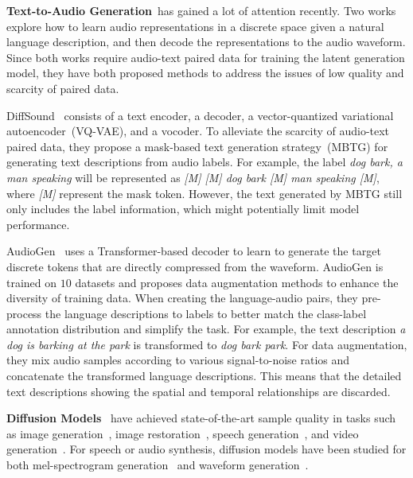 \documentclass{article}
\begin{document}
\label{TTA}








\textbf{Text-to-Audio Generation}~has gained a lot of attention recently. Two works~\cite{yang2022diffsound,kreuk2022audiogen} explore how to learn audio representations in a discrete space given a natural language description, and then decode the representations to the audio waveform. Since both works require audio-text paired data for training the latent generation model, they have both proposed methods to address the issues of low quality and scarcity of paired data.

DiffSound~\cite{yang2022diffsound} consists of a text encoder, a decoder, a vector-quantized variational autoencoder~(VQ-VAE), and a vocoder. To alleviate the scarcity of audio-text paired data, they propose a mask-based text generation strategy~(MBTG) for generating text descriptions from audio labels. For example, the label \textit{dog bark, a man speaking} will be represented as \textit{[M] [M] dog bark [M] man speaking [M]}, where \textit{[M]} represent the mask token. However, the text generated by MBTG still only includes the label information, which might potentially limit model performance. 


AudioGen~\cite{kreuk2022audiogen} uses a Transformer-based decoder to learn to generate the target discrete tokens that are directly compressed from the waveform. AudioGen is trained on $10$ datasets and proposes data augmentation methods to enhance the diversity of training data. When creating the language-audio pairs, they pre-process the language descriptions to labels to better match the class-label annotation distribution and simplify the task. For example, 
the text description \textit{a dog is barking at the park} is transformed to \textit{dog bark park}. For data augmentation, they mix audio samples according to various signal-to-noise ratios and concatenate the transformed language descriptions. This means that the detailed text descriptions showing the spatial and temporal relationships are discarded.



\textbf{Diffusion Models}~\cite{DDPM, SGM} have achieved state-of-the-art sample quality in tasks such as image generation~\cite{DiffusionBeatsGANs, DALLE2, Imagen}, image restoration~\cite{ISRIR}, speech generation~\cite{WaveGrad, DiffWave, leng2022binauralgrad}, and video generation~\cite{MakeAVideo, ImagenVideo}. For speech or audio synthesis, diffusion models have been studied for both mel-spectrogram generation~\cite{Grad-TTS, ResGrad} and waveform generation~\cite{BDDM, PriorGrad, InferGrad}. 
\end{document}
